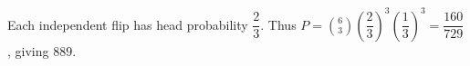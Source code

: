 Each independent flip has head probability $\dfrac{2}{3}$. Thus $P=\binom63(\dfrac{2}{3})^3(\dfrac{1}{3})^3=\dfrac{160}{729}$, giving $\boxed{889}$.
